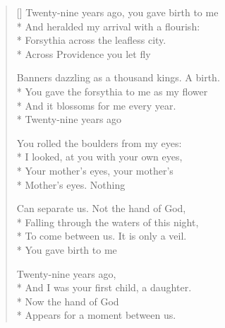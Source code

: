 \label{ch:ameditation}
\settowidth{\versewidth}{Banners dazzling as a thousand kings. A birth.}
\begin{verse}[\versewidth]
Twenty-nine years ago, you gave birth to me\\*
And heralded my arrival with a flourish:\\*
Forsythia across the leafless city.\\*
Across Providence you let fly

Banners dazzling as a thousand kings. A birth.\\*
You gave the forsythia to me as my flower\\*
And it blossoms for me every year.\\*
Twenty-nine years ago

You rolled the boulders from my eyes:\\*
I looked, at you with your own eyes,\\*
Your mother's eyes, your mother's\\*
Mother's eyes. Nothing

Can separate us. Not the hand of God,\\*
Falling through the waters of this night,\\*
To come between us. It is only a veil.\\*
You gave birth to me

Twenty-nine years ago,\\*
And I was your first child, a daughter.\\*
Now the hand of God\\*
Appears for a moment between us.
\end{verse}
